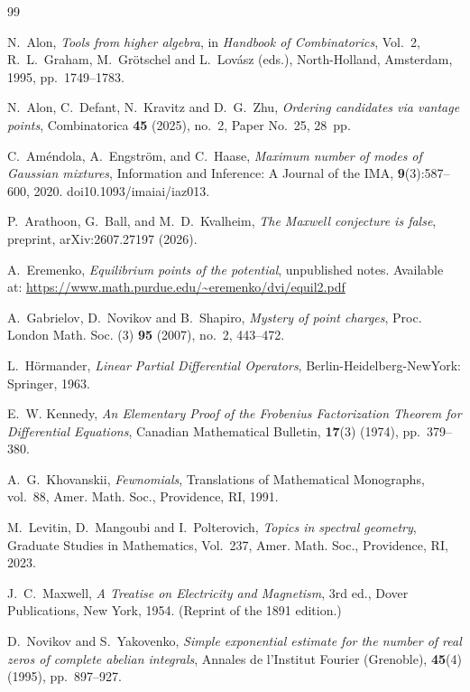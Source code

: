 \documentclass{article}
\begin{document}
\begin{thebibliography}{99}


 N.~Alon, \emph{Tools from higher algebra}, in \emph{Handbook of Combinatorics}, Vol.~2, R.~L.~Graham, M.~Gr\"otschel and L.~Lov\'asz (eds.), North-Holland, Amsterdam, 1995, pp.~1749--1783.

 N.~Alon, C.~Defant, N.~Kravitz and D.~G.~Zhu, \emph{Ordering candidates via vantage points}, Combinatorica \textbf{45} (2025), no.~2, Paper No.~25, 28~pp.

C.~Am{\'e}ndola, A.~Engstr{\"o}m, and C.~Haase,
\newblock \emph{Maximum number of modes of Gaussian mixtures},
\newblock Information and Inference: A Journal of the IMA, \textbf{9}(3):587--600, 2020.
\newblock doi{10.1093/imaiai/iaz013}.

P.~Arathoon, G.~Ball, and M.~D.~Kvalheim, \emph{The Maxwell conjecture is false}, preprint, arXiv:2607.27197 (2026). 

A.~Eremenko, \emph{Equilibrium points of the potential}, unpublished notes. Available at: \url{https://www.math.purdue.edu/~eremenko/dvi/equil2.pdf}

 A.~Gabrielov, D.~Novikov and B.~Shapiro, \emph{Mystery of point charges}, Proc. London Math. Soc. (3) \textbf{95} (2007), no.~2, 443--472.

L.~H\"ormander, \emph{Linear Partial Differential Operators}, Berlin-Heidelberg-NewYork:
Springer, 1963.


E.~W. Kennedy, 
\emph{An Elementary Proof of the Frobenius Factorization Theorem for Differential Equations}, 
Canadian Mathematical Bulletin, \textbf{17}(3) (1974), pp.~379--380. 



 A.~G.~Khovanskii, \emph{Fewnomials}, Translations of Mathematical Monographs, vol.~88, Amer. Math. Soc., Providence, RI, 1991.

 M.~Levitin, D.~Mangoubi and I.~Polterovich, \emph{Topics in spectral geometry}, Graduate Studies in Mathematics, Vol.~237, Amer. Math. Soc., Providence, RI, 2023.

 J.~C.~Maxwell, \emph{A Treatise on Electricity and Magnetism}, 3rd ed., Dover Publications, New York, 1954. (Reprint of the 1891 edition.)



D.~Novikov and S.~Yakovenko,
\emph{Simple exponential estimate for the number of real zeros of complete abelian integrals},
Annales de l'Institut Fourier (Grenoble), \textbf{45}(4) (1995), pp.~897--927.


\end{thebibliography}
\end{document}
